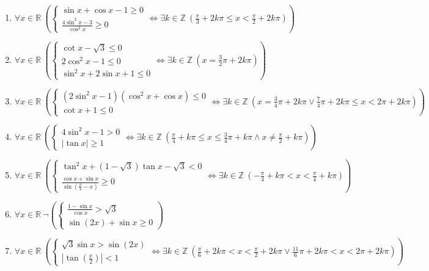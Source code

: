 \documentclass[11pt,a4paper]{article}
\begin{document}
\begin{enumerate}
\item $\displaystyle \forall x \in \mathbb{R}\ \left( \begin{cases} \sin x + \cos x - 1 \ge 0 \\ \frac{4\sin^{2} x - 3}{\cos^{2} x} \ge 0 \end{cases} \iff \exists k \in \mathbb{Z}\ \left( \frac{\pi}{3} + 2k\pi \le x < \frac{\pi}{2} + 2k\pi \right) \right)$
\item $\displaystyle \forall x \in \mathbb{R}\ \left( \begin{cases} \cot x - \sqrt{3} \le 0 \\ 2\cos^{2} x - 1 \le 0 \\ \sin^{2} x + 2\sin x + 1 \le 0 \end{cases} \iff \exists k \in \mathbb{Z}\ \left( x = \frac{3}{2}\pi + 2k\pi \right) \right)$
\item $\displaystyle \forall x \in \mathbb{R}\ \left( \begin{cases} (2\sin^{2} x - 1)(\cos^{2} x + \cos x) \le 0 \\ \cot x + 1 \le 0 \end{cases} \iff \exists k \in \mathbb{Z}\ \left( x = \frac{3}{4}\pi + 2k\pi \lor \frac{7}{4}\pi + 2k\pi \le x < 2\pi + 2k\pi \right) \right)$
\item $\displaystyle \forall x \in \mathbb{R}\ \left( \begin{cases} 4\sin^{2} x - 1 > 0 \\ \left|\tan x\right| \ge 1 \end{cases} \iff \exists k \in \mathbb{Z}\ \left( \frac{\pi}{4} + k\pi \le x \le \frac{3}{4}\pi + k\pi \land x \neq \frac{\pi}{2} + k\pi \right) \right)$
\item $\displaystyle \forall x \in \mathbb{R}\ \left( \begin{cases} \tan^{2} x + (1 - \sqrt{3})\tan x - \sqrt{3} < 0 \\ \frac{\cos x + \sin x}{\sin\left(\frac{\pi}{4} - x\right)} \ge 0 \end{cases} \iff \exists k \in \mathbb{Z}\ \left( -\frac{\pi}{4} + k\pi < x < \frac{\pi}{4} + k\pi \right) \right)$
\item $\displaystyle \forall x \in \mathbb{R}\ \lnot \left( \begin{cases} \frac{1 - \sin x}{\cos x} > \sqrt{3} \\ \sin\left(2x\right) + \sin x \ge 0 \end{cases} \right)$
\item $\displaystyle \forall x \in \mathbb{R}\ \left( \begin{cases} \sqrt{3}\sin x > \sin\left(2x\right) \\ \left|\tan\left(\frac{x}{2}\right)\right| < 1 \end{cases} \iff \exists k \in \mathbb{Z}\ \left( \frac{\pi}{6} + 2k\pi < x < \frac{\pi}{2} + 2k\pi \lor \frac{11}{6}\pi + 2k\pi < x < 2\pi + 2k\pi \right) \right)$

\end{enumerate}
\end{document}

